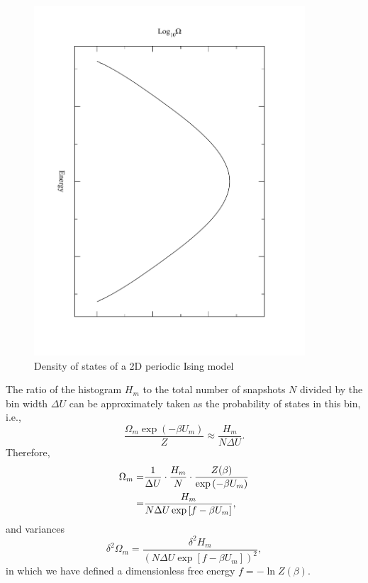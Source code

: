 \begin{figure}
	\includegraphics[angle=90,width=0.9\textwidth]{figures/dos}
	\caption{Density of states of a 2D periodic Ising model\label{Fig:FEM:WHAM:histogram}}
\end{figure}

The ratio of the histogram $H_m$ to the total number of snapshots $N$ divided by the bin width $\Delta U$ can be approximately taken as the probability of states in this bin, i.e.,
\begin{equation}
	\frac{\Omega_m\exp{(-\beta U_m)}}{Z}\approx\frac{H_m}{N\Delta U}.
\end{equation}
Therefore,
\begin{align}
	\Omega_m=&\frac{1}{\Delta U}\cdot\frac{H_m}{N}\cdot\frac{Z(\beta)}{\exp{(-\beta U_m)}}\notag\\
	        =&\frac{H_m}{N\Delta U\exp{\left[f-\beta U_m\right]}},
	\label{Eq:FEM:WHAM:DoSsingle}
\end{align}
and variances
\begin{equation}
	\delta^2\Omega_m=\frac{\delta^2 H_m}{\left(N\Delta U\exp{\left[f-\beta U_m\right]}\right)^2},
\end{equation}
in which we have defined a dimensionless free energy $f=-\ln{Z(\beta)}$.

